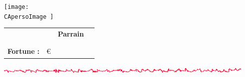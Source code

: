 \begin{minipage}[ht]{0.15\textwidth}
	\begin{center}
		\texttt{[image: \\CApersoImage ]}
	\end{center}
	
\end{minipage} \hfill \begin{minipage}[ht]{0.80\textwidth}
	\begin{tabular}[c]{ p{} p{} p{} p{} }
		\FRdefPersonnalInfosNAM	& \CApersoName \dotfill		&	\textbf{Parrain}		& \CApersoPARRAIN \dotfill	\\
		\FRdefPersonnalInfosOCC	& \CApersoTitle \dotfill	&	\FRdefPersonnalInfosAGE & \CApersoAGE \dotfill		\\
		\FRdefPersonnalInfosPRO	& \CApersoMETIER \dotfill	&	\FRdefPersonnalInfosSEX	& \CApersoSEXE \dotfill		\\
		\textbf{Fortune : }		& \CApersoARGENT \euro		&	\dotfill				& \dotfill					\\
	\end{tabular}
	
	\begin{center}
		\includegraphics[width=0.95\textwidth]{Filet_CA.png}
	\end{center}
	

\end{minipage}

